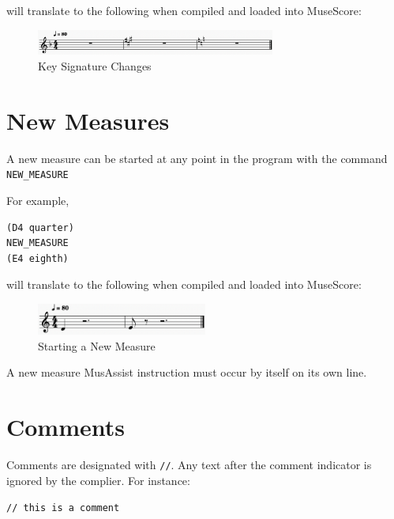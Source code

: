 \documentclass{report}
\begin{document}
will translate to the following when compiled and loaded into MuseScore:

\begin{figure}[h!]
\centering
\includegraphics[width=0.7\textwidth]{images/keys}
  \caption{Key Signature Changes}
\end{figure}
\newpage

\section{New Measures}
A new measure can be started at any point in the program with the command \verb.NEW_MEASURE.

For example,
\begin{verbatim}
(D4 quarter)
NEW_MEASURE
(E4 eighth)
\end{verbatim}

will translate to the following when compiled and loaded into MuseScore:

\begin{figure}[h!]
\centering
\includegraphics[width=0.5\textwidth]{images/newmeasure}
  \caption{Starting a New Measure}
\end{figure}

A new measure MusAssist instruction must occur by itself on its own line.

\section{Comments}
Comments are designated with \verb.//.. Any text after the comment indicator is ignored by the complier. For instance:

 \verb.// this is a comment.


\end{document}

